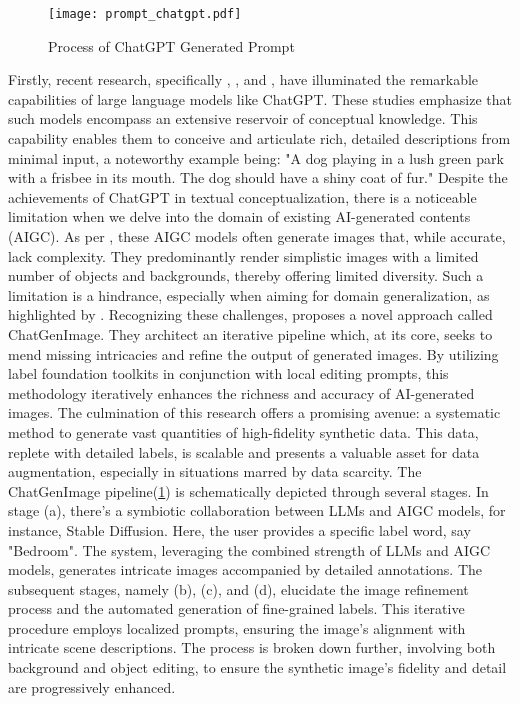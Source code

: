\documentclass[preprint,12pt,authoryear]{elsarticle}
\begin{document}
\begin{figure}
    \centering    \centerline{\texttt{[image: prompt\_chatgpt.pdf]}}
    \caption{Process of ChatGPT Generated Prompt\cite{121_chatgpt_prompt} }
    \label{fig:chatgpt_prompt}
\end{figure}

Firstly, recent research, specifically \cite{121_chatgpt_prompt}, \cite{126_chatgpt_prompt}, and \cite{127_chatgpt_prompt}, have illuminated the remarkable capabilities of large language models like ChatGPT. These studies emphasize that such models encompass an extensive reservoir of conceptual knowledge. This capability enables them to conceive and articulate rich, detailed descriptions from minimal input, a noteworthy example being: "A dog playing in a lush green park with a frisbee in its mouth. The dog should have a shiny coat of fur." Despite the achievements of ChatGPT in textual conceptualization, there is a noticeable limitation when we delve into the domain of existing AI-generated contents (AIGC). As per \cite{129_AIGC,131_AIGC,132_AIGC}, these AIGC models often generate images that, while accurate, lack complexity. They predominantly render simplistic images with a limited number of objects and backgrounds, thereby offering limited diversity. Such a limitation is a hindrance, especially when aiming for domain generalization, as highlighted by \cite{128_chatgpt_prompt}. Recognizing these challenges, \cite{121_chatgpt_prompt} proposes a novel approach called ChatGenImage. They architect an iterative pipeline which, at its core, seeks to mend missing intricacies and refine the output of generated images. By utilizing label foundation toolkits in conjunction with local editing prompts, this methodology iteratively enhances the richness and accuracy of AI-generated images. The culmination of this research offers a promising avenue: a systematic method to generate vast quantities of high-fidelity synthetic data. This data, replete with detailed labels, is scalable and presents a valuable asset for data augmentation, especially in situations marred by data scarcity.  The ChatGenImage pipeline(\ref{fig:chatgpt_prompt}) is schematically depicted through several stages. In stage (a), there's a symbiotic collaboration between LLMs and AIGC models, for instance, Stable Diffusion\cite{133_stable_diffusion}. Here, the user provides a specific label word, say "Bedroom". The system, leveraging the combined strength of LLMs and AIGC models, generates intricate images accompanied by detailed annotations. The subsequent stages, namely (b), (c), and (d), elucidate the image refinement process and the automated generation of fine-grained labels. This iterative procedure employs localized prompts, ensuring the image's alignment with intricate scene descriptions. The process is broken down further, involving both background and object editing, to ensure the synthetic image's fidelity and detail are progressively enhanced.
\end{document}
